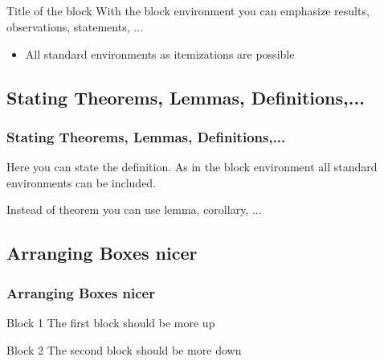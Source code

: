 \documentclass{beamer}
\newcommand{\subsectitle}{}
\newcommand{\subsectiontitle}[1]{\renewcommand{\subsectitle}{#1}}
\begin{document}
       \subsection{\subsectitle}
       \begin{frame}
         \frametitle{\subsectitle}
        \begin{block}{Title of the block}
          With the block environment you can emphasize results, observations,
          statements, ...
          \begin{itemize}
            \item All standard environments as itemizations are possible
          \end{itemize}
        \end{block}
      
\end{frame}


 \subsectiontitle{Stating Theorems, Lemmas, Definitions,... }
       \subsection{\subsectitle}
       \begin{frame}
         \frametitle{\subsectitle}

        \begin{definition}[3]          Here you can state the definition. As in the block
          environment all standard environments can be included.
        \end{definition}

        \begin{theorem}[1]
          Instead of theorem you can use lemma, corollary, ... 
        \end{theorem}
      \end{frame}




 \subsectiontitle{Arranging Boxes nicer}
       \subsection{\subsectitle}
       \begin{frame}
         \frametitle{\subsectitle}

        \begin{block}{Block 1}      The first block should be more up 
        \end{block}
\rule{0pt}{2cm}
        \begin{block}{Block 2}
          The second block should be more down
        \end{block}
      \end{frame}


 
\end{document}
